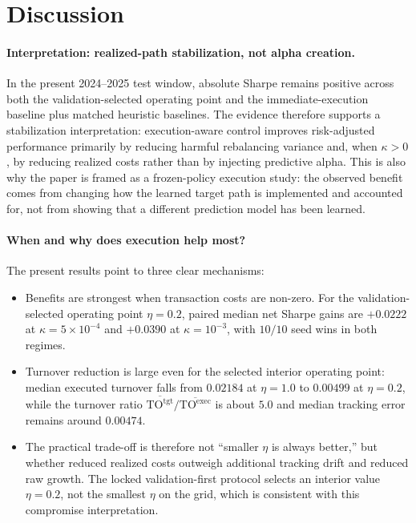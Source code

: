 \documentclass[10pt,twocolumn]{article}
\newcommand{\TOexec}{\mathrm{TO}^{\mathrm{exec}}}
\newcommand{\TOtgt}{\mathrm{TO}^{\mathrm{tgt}}}
\newcommand{\kappaTC}{\kappa}
\begin{document}
\section{Discussion}
\paragraph{Interpretation: realized-path stabilization, not alpha creation.}
In the present 2024--2025 test window, absolute Sharpe remains positive across both the validation-selected operating point and the immediate-execution baseline plus matched heuristic baselines. The evidence therefore supports a stabilization interpretation: execution-aware control improves risk-adjusted performance primarily by reducing harmful rebalancing variance and, when $\kappaTC>0$, by reducing realized costs rather than by injecting predictive alpha. This is also why the paper is framed as a frozen-policy execution study: the observed benefit comes from changing how the learned target path is implemented and accounted for, not from showing that a different prediction model has been learned.

\paragraph{When and why does execution help most?}
The present results point to three clear mechanisms:
\begin{itemize}[leftmargin=*,itemsep=1pt]
\item Benefits are strongest when transaction costs are non-zero. For the validation-selected operating point $\eta=0.2$, paired median net Sharpe gains are $+0.0222$ at $\kappa=5\times10^{-4}$ and $+0.0390$ at $\kappa=10^{-3}$, with $10/10$ seed wins in both regimes.
\item Turnover reduction is large even for the selected interior operating point: median executed turnover falls from $0.02184$ at $\eta=1.0$ to $0.00499$ at $\eta=0.2$, while the turnover ratio $\overline{\TOtgt}/\overline{\TOexec}$ is about $5.0$ and median tracking error remains around $0.00474$.
\item The practical trade-off is therefore not ``smaller $\eta$ is always better,'' but whether reduced realized costs outweigh additional tracking drift and reduced raw growth. The locked validation-first protocol selects an interior value $\eta=0.2$, not the smallest $\eta$ on the grid, which is consistent with this compromise interpretation.
\end{itemize}
\end{document}
